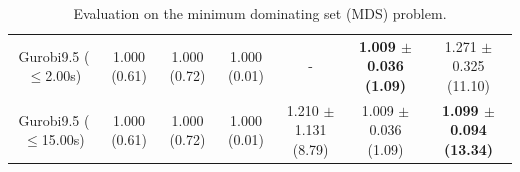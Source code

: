 \begin{table}[]
\begin{minipage}{1.00 \linewidth}
\begin{tabular}{@{}ccccccc@{}}
Gurobi9.5 ($\leq$2.00s) & 1.000 (0.61)         &    1.000 (0.72)     &    1.000 (0.01)     &     -    &  \textbf{1.009 \hspace{-0.3mm}$\pm$\hspace{-0.3mm} 0.036 (1.09)}      &    1.271 \hspace{-0.3mm}$\pm$\hspace{-0.3mm} 0.325 (11.10)    \\
Gurobi9.5 ($\leq$15.00s) &      1.000 (0.61)              &    1.000 (0.72)     &     1.000 (0.01)    &     1.210 \hspace{-0.3mm}$\pm$\hspace{-0.3mm} 1.131 (8.79)    &    1.009 \hspace{-0.3mm}$\pm$\hspace{-0.3mm} 0.036 (1.09)   &    \textbf{1.099 \hspace{-0.3mm}$\pm$\hspace{-0.3mm} 0.094 (13.34)}    \\ \bottomrule
\end{tabular}
    \vspace{-0.3cm}
     \caption{Evaluation on the minimum dominating set (MDS) problem.}
     \label{tab:mds_performance}
    \end{minipage}
\end{table}




